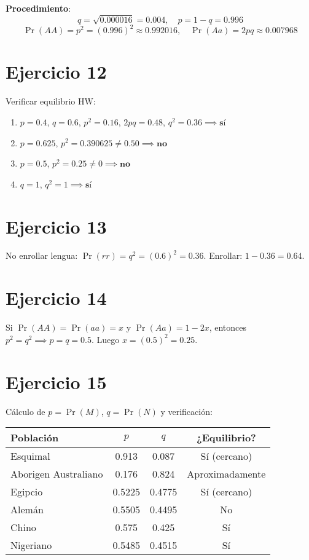 \documentclass{article}
\begin{document}
	\textbf{Procedimiento}:
	\[
	q = \sqrt{0.000016} = 0.004, \quad p = 1 - q = 0.996
	\]
	\[
	\Pr(AA) = p^2 = (0.996)^2 \approx 0.992016, \quad \Pr(Aa) = 2pq \approx 0.007968
	\]
	
	\section*{Ejercicio 12}
	Verificar equilibrio HW:
	\begin{enumerate}[label=\alph*)]
		\item \( p = 0.4 \), \( q = 0.6 \), \( p^2 = 0.16 \), \( 2pq = 0.48 \), \( q^2 = 0.36 \implies \textbf{sí} \)
		\item \( p = 0.625 \), \( p^2 = 0.390625 \neq 0.50 \implies \textbf{no} \)
		\item \( p = 0.5 \), \( p^2 = 0.25 \neq 0 \implies \textbf{no} \)
		\item \( q = 1 \), \( q^2 = 1 \implies \textbf{sí} \)
	\end{enumerate}
	
	\section*{Ejercicio 13}
	No enrollar lengua: \( \Pr(rr) = q^2 = (0.6)^2 = 0.36 \). Enrollar: \( 1 - 0.36 = 0.64 \).
	
	\section*{Ejercicio 14}
	Si \( \Pr(AA) = \Pr(aa) = x \) y \( \Pr(Aa) = 1 - 2x \), entonces \( p^2 = q^2 \implies p = q = 0.5 \). Luego \( x = (0.5)^2 = 0.25 \).
	
	\section*{Ejercicio 15}
	Cálculo de \( p = \Pr(M) \), \( q = \Pr(N) \) y verificación:
	\begin{center}
		\begin{tabular}{l|c|c|c}
			Población & \( p \) & \( q \) & ¿Equilibrio? \\
			\hline
			Esquimal & 0.913 & 0.087 & Sí (cercano) \\
			Aborigen Australiano & 0.176 & 0.824 & Aproximadamente \\
			Egipcio & 0.5225 & 0.4775 & Sí (cercano) \\
			Alemán & 0.5505 & 0.4495 & No \\
			Chino & 0.575 & 0.425 & Sí \\
			Nigeriano & 0.5485 & 0.4515 & Sí \\
		\end{tabular}
	\end{center}
	
\end{document}
